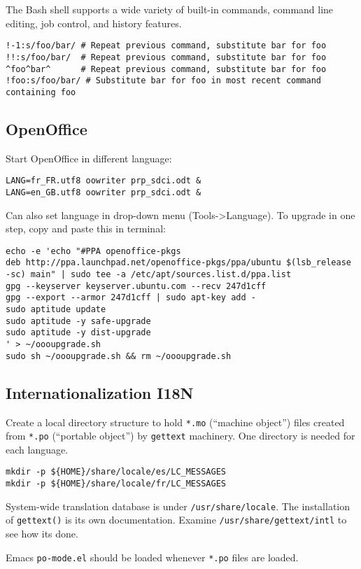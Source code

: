 \documentclass[12pt,twoside]{article}
\begin{document}
The Bash shell supports a wide variety of built-in commands, command
line editing, job control, and history features.
\begin{verbatim}
!-1:s/foo/bar/ # Repeat previous command, substitute bar for foo
!!:s/foo/bar/  # Repeat previous command, substitute bar for foo
^foo^bar^      # Repeat previous command, substitute bar for foo
!foo:s/foo/bar/ # Substitute bar for foo in most recent command containing foo
\end{verbatim}

\subsection{OpenOffice}\label{sxn:ooo}
Start OpenOffice in different language:
\begin{verbatim}
LANG=fr_FR.utf8 oowriter prp_sdci.odt &
LANG=en_GB.utf8 oowriter prp_sdci.odt &
\end{verbatim}
Can also set language in drop-down menu (Tools->Language).
To upgrade in one step, copy and paste this in terminal:
\begin{verbatim}
echo -e 'echo "#PPA openoffice-pkgs
deb http://ppa.launchpad.net/openoffice-pkgs/ppa/ubuntu $(lsb_release -sc) main" | sudo tee -a /etc/apt/sources.list.d/ppa.list
gpg --keyserver keyserver.ubuntu.com --recv 247d1cff
gpg --export --armor 247d1cff | sudo apt-key add -
sudo aptitude update
sudo aptitude -y safe-upgrade
sudo aptitude -y dist-upgrade
' > ~/oooupgrade.sh
sudo sh ~/oooupgrade.sh && rm ~/oooupgrade.sh
\end{verbatim}

\subsection{Internationalization I18N}\label{sxn:i18n}
Create a local directory structure to hold \verb'*.mo' (``machine
object'') files created from \verb'*.po' (``portable object'') by
\verb'gettext' machinery. 
One directory is needed for each language.
\begin{verbatim}
mkdir -p ${HOME}/share/locale/es/LC_MESSAGES
mkdir -p ${HOME}/share/locale/fr/LC_MESSAGES
\end{verbatim}
System-wide translation database is under \verb'/usr/share/locale'.
The installation of \verb'gettext()' is its own documentation.
Examine \verb'/usr/share/gettext/intl' to see how its done.

Emacs \verb'po-mode.el' should be loaded whenever \verb'*.po' files
are loaded.
\end{document}
